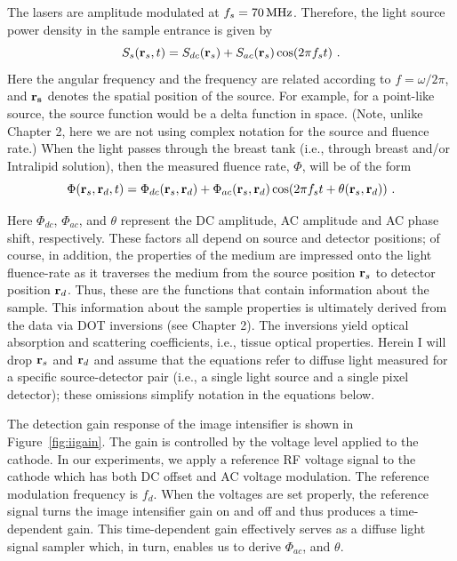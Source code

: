 The lasers are amplitude modulated at $f_{s}=70\,{\rm MHz}$. Therefore, the light source power density in the sample entrance is given by
\begin{equation}
S_s(\mathbf{r}_s,t) = S_{dc}(\mathbf{r}_s) + S_{ac}(\mathbf{r}_s)\cos(2\pi f_s t) \ .
\end{equation}
\noindent
Here the angular frequency and the frequency are related according to $f=\omega/2\pi$, and $\mathbf{r_s}$ denotes the spatial position of the source. For example, for a point-like source, the source function would be a delta function in space. (Note, unlike Chapter 2, here we are not using complex notation for the source and fluence rate.) When the light passes through the breast tank (i.e., through breast and/or Intralipid solution), then the measured fluence rate, $\Phi$, will be of the form
\begin{equation}
\label{eqn:FDfluence}
\Phi(\mathbf{r}_s,\mathbf{r}_d,t) = \Phi_{dc}(\mathbf{r}_s,\mathbf{r}_d) + \Phi_{ac}(\mathbf{r}_s,\mathbf{r}_d)\cos(2\pi f_s t + \theta(\mathbf{r}_s,\mathbf{r}_d)) \ .
\end{equation}

Here $\Phi_{dc}$, $\Phi_{ac}$, and $\theta$ represent the DC amplitude, AC amplitude and AC phase shift, respectively. These factors all depend on source and detector positions; of course, in addition, the properties of the medium are impressed onto the light fluence-rate as it traverses the medium from the source position $\mathbf{r}_s$ to detector position $\mathbf{r}_d$. Thus, these are the functions that contain information about the sample. This information about the sample properties is ultimately derived from the data via DOT inversions (see Chapter 2). The inversions yield optical absorption and scattering coefficients, i.e., tissue optical properties. Herein I will drop $\mathbf{r}_s$ and $\mathbf{r}_d$ and assume that the equations refer to diffuse light measured for a specific source-detector pair (i.e., a single light source and a single pixel detector); these omissions simplify notation in the equations below.

The detection gain response of the image intensifier is shown in Figure~\ref{fig:iigain}. The gain is controlled by the voltage level applied to the cathode. In our experiments, we apply a reference RF voltage signal to the cathode which has both DC offset and AC voltage modulation. The reference modulation frequency is $f_d$. When the voltages are set properly, the reference signal turns the image intensifier gain on and off and thus produces a time-dependent gain. This time-dependent gain effectively serves as a diffuse light signal sampler which, in turn, enables us to derive $\Phi_{ac}$, and $\theta$.

